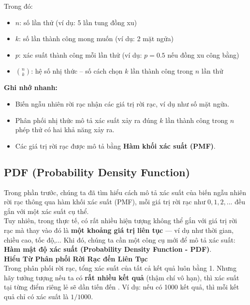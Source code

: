 \documentclass[11pt]{article}
\begin{document}
Trong đó:
\begin{itemize}
    \item $n$: số lần thử (ví dụ: 5 lần tung đồng xu)
    \item $k$: số lần thành công mong muốn (ví dụ: 2 mặt ngửa)
    \item $p$: xác suất thành công mỗi lần thử (ví dụ: $p = 0.5$ nếu đồng xu công bằng)
    \item $\binom{n}{k}$: hệ số nhị thức – số cách chọn $k$ lần thành công trong $n$ lần thử
\end{itemize}

\vspace{1em}

\begin{summarybox}
    \textbf{Ghi nhớ nhanh:} 
    \begin{itemize}
        \item Biến ngẫu nhiên rời rạc nhận các giá trị rời rạc, ví dụ như số mặt ngửa.
        \item Phân phối nhị thức mô tả xác suất xảy ra đúng $k$ lần thành công trong $n$ phép thử có hai khả năng xảy ra.
        \item Các giá trị rời rạc được mô tả bằng \textbf{Hàm khối xác suất (PMF)}.
    \end{itemize}
\end{summarybox}

\subsection{PDF (Probability Density Function)}
Trong phần trước, chúng ta đã tìm hiểu cách mô tả xác suất của biến ngẫu nhiên rời rạc thông qua hàm khối xác suất (PMF),  mỗi giá trị rời rạc như $0, 1, 2,...$ đều gắn với một xác suất cụ thể. \\ 

Tuy nhiên, trong thực tế, có rất nhiều hiện tượng không thể gắn với giá trị rời rạc mà thay vào đó là \textbf{một khoảng giá trị liên tục} — ví dụ như thời gian, chiều cao, tốc độ,... Khi đó, chúng ta cần một công cụ mới để mô tả xác suất: \textbf{Hàm mật độ xác suất (Probability Density Function - PDF)}. \\

\noindent \textbf{Hiểu Từ Phân phối Rời Rạc đến Liên Tục} \\ 
Trong phân phối rời rạc, tổng xác suất của tất cả kết quả luôn bằng 1. Nhưng hãy tưởng tượng nếu ta có \textbf{rất nhiều kết quả} (thậm chí vô hạn), thì xác suất tại từng điểm riêng lẻ sẽ dần tiến đến . Ví dụ: nếu có 1000 kết quả, thì mỗi kết quả chỉ có xác suất là $1/1000$. \\
\end{document}
